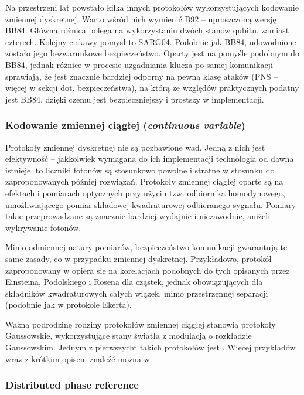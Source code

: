 \documentclass[10pt]{article}
\begin{document}
Na przestrzeni lat powstało kilka innych protokołów wykorzystujących kodowanie zmiennej dyskretnej.
Warto wśród nich wymienić B92 -- uproszczoną wersję BB84\cite{Bennett92}. Główna różnica polega na
wykorzystaniu dwóch stanów qubitu, zamiast czterech. Kolejny ciekawy pomysł to SARG04\cite{Scarani04}.
Podobnie jak BB84, udowodnione zostało jego bezwarunkowe bezpieczeństwo. Oparty jest na pomyśle 
podobnym do BB84, jednak różnice w procesie uzgadniania klucza po samej komunikacji sprawiają, że jest
znacznie bardziej odporny na pewną klasę ataków (PNS -- więcej w sekcji dot. bezpieczeństwa), na którą 
ze względów praktycznych podatny jest BB84, dzięki czemu jest bezpieczniejszy i prostszy w implementacji.


\subsubsection*{Kodowanie zmiennej ciągłej (\emph{continuous variable})}

Protokoły zmiennej dyskretnej nie są pozbawione wad. Jedną z nich jest efektywność -- jakkolwiek
wymagana do ich implementacji technologia od dawna istnieje, to liczniki fotonów są stosunkowo
powolne i stratne w stosunku do zaproponowanych później rozwiązań\cite{Reid00,Cerf01}. Protokoły
zmiennej ciągłej oparte są na efektach i pomiarach optycznych przy użyciu tzw. odbiornika homodynowego,
umożliwiającego pomiar składowej kwadraturowej odbieranego sygnału. Pomiary takie przeprowadzane
są znacznie bardziej wydajnie i niezawodnie, aniżeli wykrywanie fotonów.

Mimo odmiennej natury pomiarów, bezpieczeństwo komunikacji gwarantują te same zasady, co w przypadku
zmiennej dyskretnej. Przykładowo, protokół zaproponowany w\cite{Reid00} opiera się na korelacjach 
podobnych do tych opisanych przez Einsteina, Podolskiego i Rosena dla cząstek, jednak obowiązujących 
dla składników kwadraturowych całych wiązek, mimo przestrzennej separacji (podobnie jak w protokole 
Ekerta).

Ważną podrodzinę rodziny protokołów zmiennej ciągłej stanowią protokoły Gaussowskie, wykorzystujące
stany światła z modulacją o rozkładzie Gaussowskim. Jednym z pierwszycht takich protokołów jest 
\cite{Cerf01}. Więcej przykładów wraz z krótkim opisem znaleźć można w\cite{Scarani09}.


\subsubsection*{Distributed phase reference}
\end{document}
